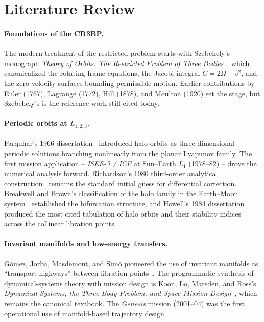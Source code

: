 \documentclass[11pt,a4paper]{article}
\begin{document}
\section{Literature Review}\label{sec:lit}

\paragraph{Foundations of the CR3BP.}
The modern treatment of the restricted problem starts with Szebehely's monograph \textit{Theory of Orbits: The Restricted Problem of Three Bodies}~\cite{szebehely1967}, which canonicalized the rotating-frame equations, the Jacobi integral $C = 2\Omega - v^2$, and the zero-velocity surfaces bounding permissible motion. Earlier contributions by Euler (1767), Lagrange (1772), Hill (1878), and Moulton (1920) set the stage, but Szebehely's is the reference work still cited today.

\paragraph{Periodic orbits at $L_{1,2,3}$.}
Farquhar's 1966 dissertation~\cite{farquhar1966} introduced halo orbits as three-dimensional periodic solutions branching nonlinearly from the planar Lyapunov family. The first mission application -- \textit{ISEE-3 / ICE} at Sun--Earth $L_1$ (1978--82) -- drove the numerical analysis forward. Richardson's 1980 third-order analytical construction~\cite{richardson1980} remains the standard initial guess for differential correction. Breakwell and Brown's classification of the halo family in the Earth--Moon system~\cite{breakwell1979} established the bifurcation structure, and Howell's 1984 dissertation~\cite{howell1984} produced the most cited tabulation of halo orbits and their stability indices across the collinear libration points.

\paragraph{Invariant manifolds and low-energy transfers.}
Gómez, Jorba, Masdemont, and Simó pioneered the use of invariant manifolds as ``transport highways'' between libration points~\cite{gomez1991,gomez1993}. The programmatic synthesis of dynamical-systems theory with mission design is Koon, Lo, Marsden, and Ross's \textit{Dynamical Systems, the Three-Body Problem, and Space Mission Design}~\cite{koon2006}, which remains the canonical textbook. The \textit{Genesis} mission (2001--04) was the first operational use of manifold-based trajectory design.
\end{document}

